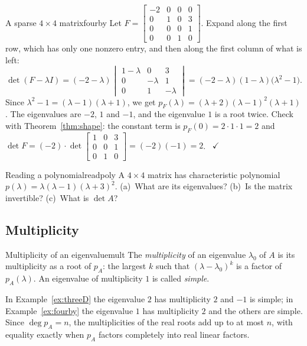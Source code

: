 \documentclass[11pt]{article}
\begin{document}
\begin{exmp}{A sparse $4\times4$ matrix}{fourby}
Let $F=\begin{bmatrix}-2&0&0&0\\0&1&0&3\\0&0&0&1\\0&0&1&0\end{bmatrix}$. Expand along the first row, which has only one nonzero entry, and then along the first column of what is left:
\[
\det(F-\lambda I)=(-2-\lambda)\begin{vmatrix}1-\lambda&0&3\\0&-\lambda&1\\0&1&-\lambda\end{vmatrix}=(-2-\lambda)(1-\lambda)\bigl(\lambda^2-1\bigr).
\]
Since $\lambda^2-1=(\lambda-1)(\lambda+1)$, we get $p_F(\lambda)=(\lambda+2)(\lambda-1)^2(\lambda+1)$. The eigenvalues are $-2$, $1$ and $-1$, and the eigenvalue $1$ is a root twice. Check with Theorem~\ref{thm:shape}: the constant term is $p_F(0)=2\cdot1\cdot1=2$ and $\det F=(-2)\cdot\det\begin{bmatrix}1&0&3\\0&0&1\\0&1&0\end{bmatrix}=(-2)(-1)=2$. \ $\checkmark$
\end{exmp}

\begin{kc}{Reading a polynomial}{readpoly}
A $4\times4$ matrix has characteristic polynomial $p(\lambda)=\lambda(\lambda-1)(\lambda+3)^2$. (a)~What are its eigenvalues? (b)~Is the matrix invertible? (c)~What is $\det A$?
\end{kc}

\subsection*{Multiplicity}

\begin{defn}{Multiplicity of an eigenvalue}{mult}
The \emph{multiplicity} of an eigenvalue $\lambda_0$ of $A$ is its multiplicity as a root of $p_A$: the largest $k$ such that $(\lambda-\lambda_0)^k$ is a factor of $p_A(\lambda)$. An eigenvalue of multiplicity $1$ is called \emph{simple}.
\end{defn}

In Example~\ref{ex:threeD} the eigenvalue $2$ has multiplicity $2$ and $-1$ is simple; in Example~\ref{ex:fourby} the eigenvalue $1$ has multiplicity $2$ and the others are simple. Since $\deg p_A=n$, the multiplicities of the real roots add up to at most $n$, with equality exactly when $p_A$ factors completely into real linear factors.
\end{document}
